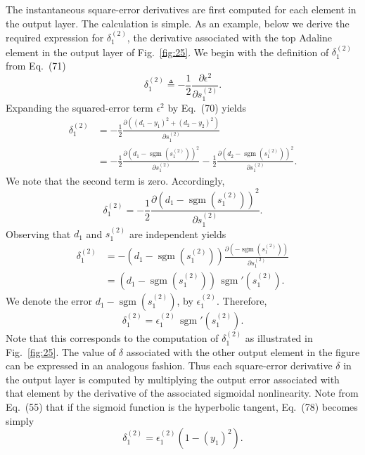 \documentclass[10pt,twocolumn]{article}
\newcommand{\sgm}{\operatorname{sgm}}
\begin{document}
The instantaneous square-error derivatives are first computed for each element in
the output layer. The calculation is simple. As an example, below we derive the
required expression for $\delta_1^{(2)}$, the derivative associated with the top
Adaline element in the output layer of Fig.~\ref{fig:25}. We begin with the
definition of $\delta_1^{(2)}$ from Eq.~(71)
\begin{equation}
\delta_1^{(2)} \triangleq -\frac{1}{2}\frac{\partial\epsilon^2}{\partial s_1^{(2)}}. \tag{72}
\end{equation}
Expanding the squared-error term $\epsilon^2$ by Eq.~(70) yields
\begin{align}
\delta_1^{(2)} &= -\frac{1}{2}\frac{\partial((d_1 - y_1)^2 + (d_2 - y_2)^2)}{\partial s_1^{(2)}} \tag{73}\\
&= -\frac{1}{2}\frac{\partial(d_1 - \sgm(s_1^{(2)}))^2}{\partial s_1^{(2)}}
   -\frac{1}{2}\frac{\partial(d_2 - \sgm(s_1^{(2)}))^2}{\partial s_1^{(2)}}. \tag{74}
\end{align}
We note that the second term is zero. Accordingly,
\begin{equation}
\delta_1^{(2)} = -\frac{1}{2}\frac{\partial(d_1 - \sgm(s_1^{(2)}))^2}{\partial s_1^{(2)}}. \tag{75}
\end{equation}
Observing that $d_1$ and $s_1^{(2)}$ are independent yields
\begin{align}
\delta_1^{(2)} &= -(d_1 - \sgm(s_1^{(2)}))\frac{\partial(-\sgm(s_1^{(2)}))}{\partial s_1^{(2)}} \tag{76}\\
&= (d_1 - \sgm(s_1^{(2)}))\,\sgm'(s_1^{(2)}). \tag{77}
\end{align}
We denote the error $d_1 - \sgm(s_1^{(2)})$, by $\epsilon_1^{(2)}$. Therefore,
\begin{equation}
\delta_1^{(2)} = \epsilon_1^{(2)}\,\sgm'(s_1^{(2)}). \tag{78}
\end{equation}
Note that this corresponds to the computation of $\delta_1^{(2)}$ as illustrated in
Fig.~\ref{fig:25}. The value of $\delta$ associated with the other output element
in the figure can be expressed in an analogous fashion. Thus each square-error
derivative $\delta$ in the output layer is computed by multiplying the output error
associated with that element by the derivative of the associated sigmoidal
nonlinearity. Note from Eq.~(55) that if the sigmoid function is the hyperbolic
tangent, Eq.~(78) becomes simply
\begin{equation}
\delta_1^{(2)} = \epsilon_1^{(2)}(1 - (y_1)^2). \tag{79}
\end{equation}
\end{document}
